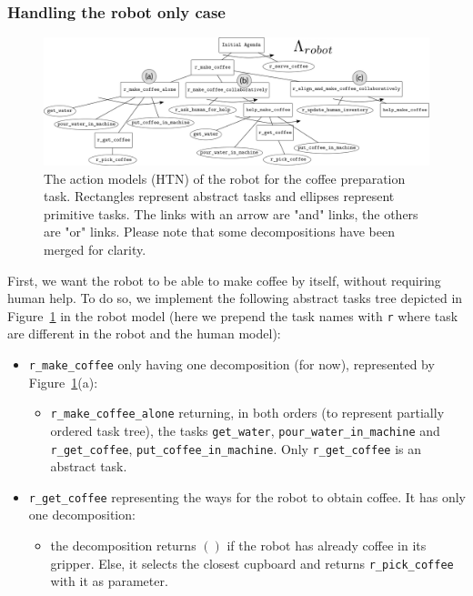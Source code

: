 \documentclass[a4paper,11pt,twoside]{StyleThese}
\begin{document}
\subsubsection{Handling the robot only case}
\label{subsubsec:chap4coffeerobotonly}
\begin{figure}[hbtp]
\centering
\includegraphics[height=0.5\textwidth, angle=90, origin=c]{figures/chapter4/HTN_r_coffee.png}
\caption{The action models (HTN) of the robot for the coffee preparation task. Rectangles represent abstract tasks and ellipses represent primitive tasks. The links with an arrow are "and" links, the others are "or" links. Please note that some decompositions have been merged for clarity.}
\label{fig:chap4rhtncoffee}
\end{figure}

First, we want the robot to be able to make coffee by itself, without requiring human help. To do so, we implement the following abstract tasks tree depicted in Figure~\ref{fig:chap4rhtncoffee} in the robot model (here we prepend the task names with \verb'r' where task are different in the robot and the human model):

\begin{itemize}
\item \verb'r_make_coffee' only having one decomposition (for now), represented by Figure~\ref{fig:chap4rhtncoffee}(a):
	\begin{itemize}
	\item \verb'r_make_coffee_alone' returning, in both orders (to represent partially ordered task tree), the tasks \verb'get_water', \verb'pour_water_in_machine' and \verb'r_get_coffee', \verb'put_coffee_in_machine'. Only \verb'r_get_coffee' is an abstract task.
	\end{itemize}
\item \verb'r_get_coffee' representing the ways for the robot to obtain coffee. It has only one decomposition:
	\begin{itemize}
	\item the decomposition returns $()$ if the robot has already coffee in its gripper. Else, it selects the closest cupboard and returns \verb'r_pick_coffee' with it as parameter.
	\end{itemize}
\end{itemize}
\end{document}
